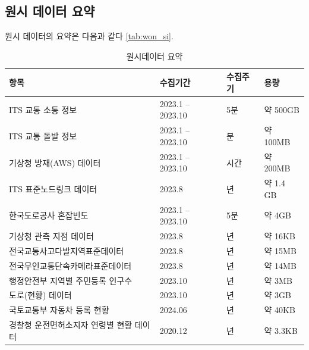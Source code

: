 \documentclass[11pt]{report}
\begin{document}
\subsection{원시 데이터 요약}
원시 데이터의 요약은 다음과 같다 \autoref{tab:won_si}.
\begin{table}[H]
	\begin{center}
	\vspace{0.5cm}
	\begin{tabular}{|l|l|l|l|}
		\hline
		\rowcolor[HTML]{C0C0C0} 
		{\color[HTML]{000000} 항목}                   & {\color[HTML]{000000} 수집기간} & {\color[HTML]{000000} 수집주기} & {\color[HTML]{000000} 용량} \\ \hline
		ITS 교통 소통 정보                                & 2023.1 -- 2023.10           & 5분                          & 약 500GB                   \\ \hline
		ITS 교통 돌발 정보                                & 2023.1 -- 2023.10           & 분                           & 약 100MB                   \\ \hline
		기상청 방재(AWS) 데이터                             & 2023.1 -- 2023.10           & 시간                          & 약 200MB                   \\ \hline
		ITS 표준노드링크 데이터                              & 2023.8                      & 년                           & 약 1.4 GB                  \\ \hline
		한국도로공사 혼잡빈도                                 & 2023.1 -- 2023.10           & 5분                          & 약 4GB                     \\ \hline
		기상청 관측 지점 데이터                               & 2023.8                      & 년                           & 약 16KB                    \\ \hline
		전국교통사고다발지역표준데이터       & 2023.8                      & 년                           & 약 15MB                    \\ \hline
		전국무인교통단속카메라표준데이터     & 2023.8                      & 년                           & 약 14MB                    \\ \hline
		행정안전부 지역별 주민등록 인구수 & 2023.10                     & 년                           & 약 3MB                     \\ \hline
		도로(현황) 데이터                                & 2023.10                     & 년                           & 약 3GB                     \\ \hline
		국토교통부 자동차 등록 현황 & 2024.06               & 년                       & 약 40KB               \\ \hline
		경찰청 운전면허소지자 연령별 현황 데이터   & 2020.12    & 년    & 약 3.3KB   \\ \hline
	\end{tabular}
	\end{center}
	\caption{원시데이터 요약}
	\label{tab:won_si}
\end{table}
\end{document}
